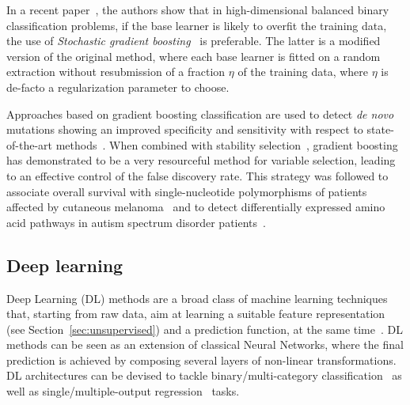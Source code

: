 	    In a recent paper~\citep{lusa2015boosting}, the authors show that in high-dimensional balanced binary classification problems, if the base learner is likely to overfit the training data, the use of \textit{Stochastic gradient boosting}~\citep{friedman2002stochastic} is preferable. The latter is a modified version of the original method, where each base learner is fitted on a random extraction without resubmission of a fraction $\eta$ of the training data, where $\eta$ is de-facto a regularization parameter to choose.

	    Approaches based on gradient boosting classification are used to detect \textit{de novo} mutations showing an improved specificity and sensitivity with respect to state-of-the-art methods~\citep{liu2014gradient}.
	    When combined with stability selection~\citep{meinshausen2010stability}, gradient boosting has demonstrated to be a very resourceful method for variable selection, leading to an effective control of the false discovery rate. This strategy was followed to associate overall survival with single-nucleotide polymorphisms of patients affected by cutaneous melanoma~\citep{he2016component} and to detect differentially expressed amino acid pathways in autism spectrum disorder patients~\citep{hofner2015controlling}.







	    \subsection{Deep learning}
	    Deep Learning (DL) methods are a broad class of machine learning techniques that, starting from raw data, aim at learning a suitable feature representation (see Section~\ref{sec:unsupervised}) and a prediction function, at the same time~\cite{lecun2015deep}. DL methods can be seen as an extension of classical Neural Networks, where the final prediction is achieved by composing several layers of non-linear transformations.
	    DL architectures can be devised to tackle binary/multi-category classification~\cite{angermueller2016deep, leung2014deep} as well as single/multiple-output regression~\cite{Chen2016GeneEI, ma2015deep} tasks.

